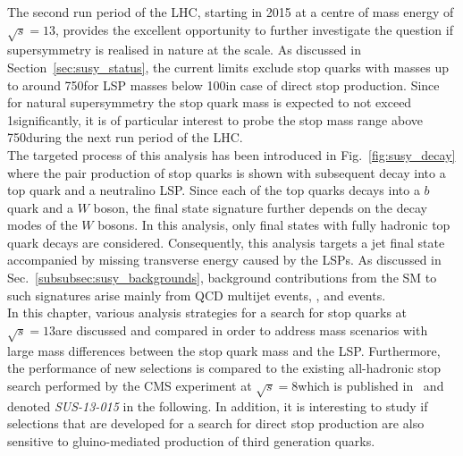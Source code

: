 The second run period of the LHC, starting in 2015 at a centre of mass energy of $\sqrt{s} = 13$\tev, provides the excellent opportunity to further investigate the question if supersymmetry is realised in nature at the \tev scale. As discussed in Section~\ref{sec:susy_status}, the current limits exclude stop quarks with masses up to around 750\gev for LSP masses below 100\gev in case of direct stop production. Since for natural supersymmetry the stop quark mass is expected to not exceed 1\tev significantly, it is of particular interest to probe the stop mass range above 750\gev during the next run period of the LHC. \\
The targeted process of this analysis has been introduced in Fig.~\ref{fig:susy_decay} where the pair production of stop quarks is shown with subsequent decay into a top quark and a neutralino LSP. Since each of the top quarks decays into a $b$ quark and a $W$ boson, the final state signature further depends on the decay modes of the $W$ bosons. In this analysis, only final states with fully hadronic top quark decays are considered. Consequently, this analysis targets a jet final state accompanied by missing transverse energy caused by the LSPs. As discussed in Sec.~\ref{subsubsec:susy_backgrounds}, background contributions from the SM to such signatures arise mainly from QCD multijet events, \WJets, \ZJets and \ttbar events. \\
In this chapter, various analysis strategies for a search for stop quarks at $\sqrt{s} = 13$\tev are discussed and compared in order to address mass scenarios with large mass differences between the stop quark mass and the LSP. Furthermore, the performance of new selections is compared to the existing all-hadronic stop search performed by the CMS experiment at $\sqrt{s} = 8$\tev which is published in~\cite{CMS-PAS-SUS-13-015} and denoted \textit{SUS-13-015} in the following. In addition, it is interesting to study if selections that are developed for a search for direct stop production are also sensitive to gluino-mediated production of third generation quarks.   

